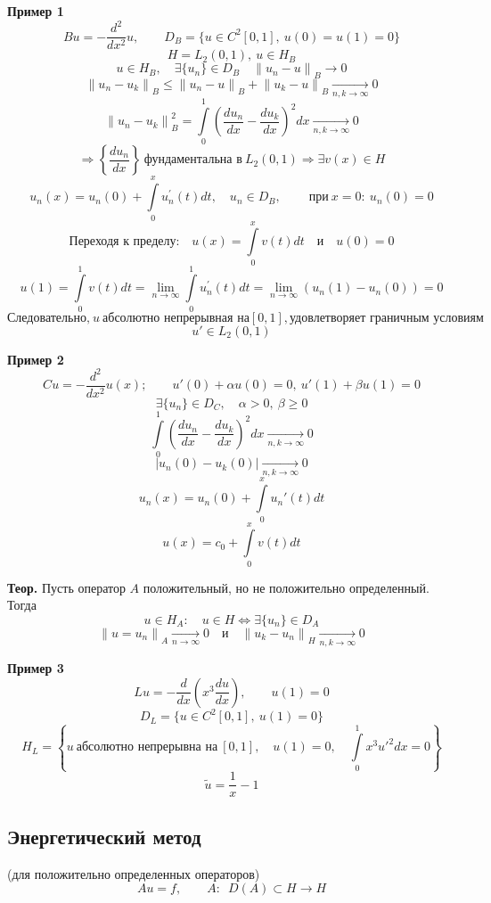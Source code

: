 \documentclass[12pt, a4paper]{article}
\begin{document}
\textbf{Пример 1}
\[ Bu = - \frac{d^2}{d x^2}u, \qquad D_{B} = \{u \in C^2 [0,1], \ u(0) = u(1) = 0 \} \]
\[ H = L_2 (0, 1), \ u \in H_B \]
\[ u \in H_B, \quad \exists \{u_n\} \in D_B \quad {\|u_n - u\|}_B \rightarrow 0 \]
\[ {\|u_n - u_k\|}_B \leq {\|u_n - u\|}_B + {\|u_k - u\|}_B \underset{n,k \rightarrow \infty}{\rightarrow} 0 \]
\[ {\|u_n - u_k\|}_B^2 = \int\limits_{0}^{1} {\left(\frac{du_n}{dx} - \frac{du_k}{dx} \right)}^2 dx \underset{n,k \rightarrow \infty}{\rightarrow} 0 \]
\[ \Rightarrow \left\{ \frac{du_n}{dx} \right\} \ \text{фундаментальна в} \ L_2(0,1) \Rightarrow \exists v(x) \in H\]
\[ u_n(x) = u_n(0) + \int\limits_{0}^{x} u_n^{'}(t) dt, \quad u_n \in D_B, \qquad \ \text{при} \ x=0:\ u_n(0) = 0 \]
\[ \text{Переходя к пределу:} \quad u(x) = \int\limits_{0}^{x} v(t) dt \quad \text{и} \quad u(0)=0\]
\[ u(1) = \int\limits_{0}^{1} v(t) dt = \lim\limits_{n \rightarrow \infty} \int\limits_{0}^{1} u_n^{'}(t) dt = \lim\limits_{n \rightarrow \infty} \left( u_n(1) - u_n(0) \right) = 0 \]
\[ \text{Следовательно,} \ u \ \text{абсолютно непрерывная на} [0,1], \text{удовлетворяет граничным условиям}\]
\[ u' \in L_2(0,1) \]

\textbf{Пример 2}
\[ Cu = - \frac{d^2}{dx^2} u(x); \qquad u'(0)+\alpha u(0)=0, \ u'(1) + \beta u(1)=0 \]
\[ \exists \{u_n\} \in D_C, \quad \alpha > 0, \ \beta \geq 0 \]
\[ \int\limits_{0}^{1} {\left( \frac{du_n}{dx} - \frac{du_k}{dx} \right)}^2 dx \underset{n, k \rightarrow \infty}{\rightarrow} 0 \]
\[ |u_n(0) - u_k(0)| \underset{n, k \rightarrow \infty}{\rightarrow} 0 \]
\[ u_n(x) = u_n(0) + \int\limits_{0}^{x} u_n'(t) dt \]
\[ u(x) = c_0 + \int\limits_{0}^{x} v(t) dt \]

\textbf{Теор.} Пусть оператор $A$ положительный, но не положительно определенный. Тогда
\[ u \in H_A: \quad u \in H \Leftrightarrow \exists \{ u_n \} \in D_A \]
\[ {\| u = u_n \|}_A \underset{n \rightarrow \infty}{\rightarrow} 0 \quad \text{и} \quad {\| u_k - u_n \|}_H \underset{n,k \rightarrow \infty}{\rightarrow} 0 \]

\textbf{Пример 3}
\[ Lu = - \frac{d}{dx} \left( x^3 \frac{du}{dx} \right), \qquad u(1)=0 \]
\[ D_L = \{u \in C^2 [0,1], \ u(1) = 0 \} \]
\[ H_L = \left\{ u \ \text{абсолютно непрерывна на} \ [0,1], \quad u(1)=0, \quad \int\limits_{0}^{1} x^3 {u'}^2 dx = 0 \right\} \]
\[ \tilde{u} = \frac{1}{x} - 1 \]

\subsection{Энергетический метод}
(для положительно определенных операторов)
\[ Au = f, \qquad A: \enspace D(A) \subset H \rightarrow H \label{4.1} \tag{4.1} \]
\end{document}
